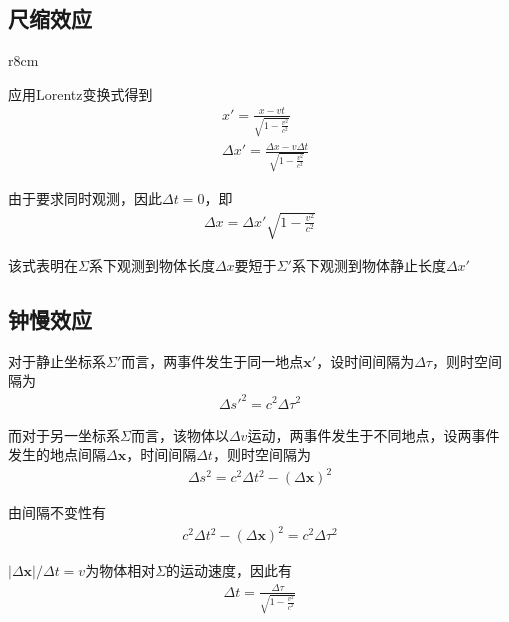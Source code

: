 \documentclass[main.tex]{subfiles}
\begin{document}
\subsection{尺缩效应}
\begin{wrapfigure}{r}{8cm}
	\centering
    
\end{wrapfigure}

应用Lorentz变换式得到
\begin{align}
    &x' = \frac{\displaystyle x - vt}{\displaystyle \sqrt{1- \frac{v^2}{c^2}}}\\
    &\Delta x' = \frac{\displaystyle \Delta x - v\Delta t}{\displaystyle \sqrt{1- \frac{v^2}{c^2}}}
\end{align}

由于要求同时观测，因此$\Delta t =0$，即
\begin{align}
    \Delta x = \Delta x ' \sqrt{1- \frac{v^2}{c^2}}
\end{align}

该式表明在$\Sigma $系下观测到物体长度$\Delta x$要短于$\Sigma '$系下观测到物体静止长度$\Delta x'$

\subsection{钟慢效应}
\begin{figure}[h]
    \centering
     
\end{figure}

对于静止坐标系$\Sigma '$而言，两事件发生于同一地点$\boldsymbol{x}'$，设时间间隔为$\Delta \tau$，则时空间隔为
\begin{align}
    \Delta s'^2 = c^2 \Delta \tau ^2
\end{align}

而对于另一坐标系$\Sigma$而言，该物体以$\Delta v$运动，两事件发生于不同地点，设两事件发生的地点间隔$\Delta \boldsymbol{x}$，时间间隔$\Delta t$，则时空间隔为
\begin{align}
    \Delta s^2 = c^2 \Delta t^2 -(\Delta \boldsymbol{x})^2
\end{align}

由间隔不变性有
\begin{align}
    c^2 \Delta t^2 -(\Delta \boldsymbol{x})^2 = c^2 \Delta \tau ^2
\end{align}

$|\Delta \boldsymbol{x}|/\Delta t = v$为物体相对$\Sigma$的运动速度，因此有
\begin{align}
    \Delta t = \frac{\displaystyle \Delta \tau }{\displaystyle \sqrt{1- \frac{v^2}{c^2}}}
\end{align}
\end{document}
